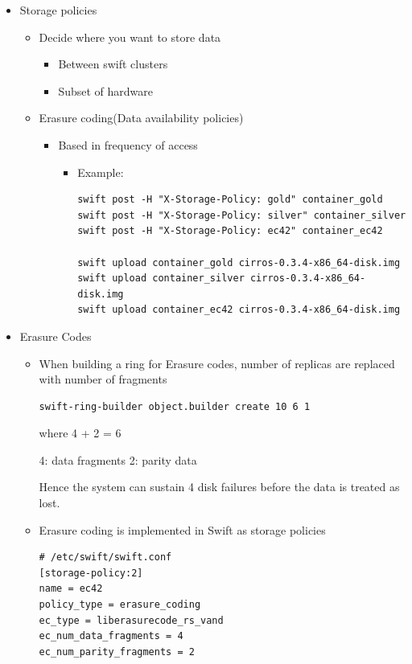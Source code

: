 \documentclass{article}
\begin{document}
\begin{itemize}
\item Storage policies
\begin{itemize}
\item Decide where you want to store data
\begin{itemize}
\item Between swift clusters
\item Subset of hardware
\end{itemize}
\item Erasure coding(Data availability policies)
\begin{itemize}
\item Based in frequency of access
\begin{itemize}
\item Example:
\begin{verbatim}
swift post -H "X-Storage-Policy: gold" container_gold
swift post -H "X-Storage-Policy: silver" container_silver
swift post -H "X-Storage-Policy: ec42" container_ec42

swift upload container_gold cirros-0.3.4-x86_64-disk.img
swift upload container_silver cirros-0.3.4-x86_64-disk.img
swift upload container_ec42 cirros-0.3.4-x86_64-disk.img
\end{verbatim}
\end{itemize}
\end{itemize}
\end{itemize}

\item Erasure Codes
\begin{itemize}
\item When building a ring for Erasure codes, number of replicas are
replaced with number of fragments

\begin{verbatim}
swift-ring-builder object.builder create 10 6 1
\end{verbatim}

where 4 + 2 = 6

4: data fragments
2: parity data

Hence the system can sustain 4 disk failures before the data is
treated as lost.

\item Erasure coding is implemented in Swift as storage policies

\begin{verbatim}
# /etc/swift/swift.conf
[storage-policy:2]
name = ec42
policy_type = erasure_coding
ec_type = liberasurecode_rs_vand
ec_num_data_fragments = 4
ec_num_parity_fragments = 2
\end{verbatim}


\end{itemize}
\end{itemize}
\end{document}
